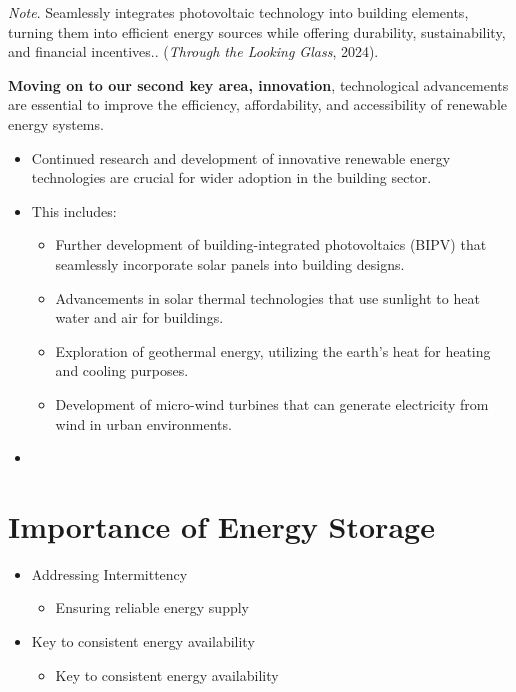 \documentclass[
  letterpaper,
  DIV=11,
  numbers=noendperiod]{scrartcl}
\providecommand{\tightlist}{%
  \setlength{\itemsep}{0pt}\setlength{\parskip}{0pt}}\usepackage{longtable,booktabs,array}
\begin{document}
\emph{Note}. Seamlessly integrates photovoltaic technology into building
elements, turning them into efficient energy sources while offering
durability, sustainability, and financial incentives.. (\emph{Through
the {Looking Glass}}, 2024).

\textbf{Moving on to our second key area, innovation}, technological
advancements are essential to improve the efficiency, affordability, and
accessibility of renewable energy systems.

\begin{itemize}
\tightlist
\item
  Continued research and development of innovative renewable energy
  technologies are crucial for wider adoption in the building sector.
\item
  This includes:

  \begin{itemize}
  \tightlist
  \item
    Further development of building-integrated photovoltaics (BIPV) that
    seamlessly incorporate solar panels into building designs.
  \item
    Advancements in solar thermal technologies that use sunlight to heat
    water and air for buildings.
  \item
    Exploration of geothermal energy, utilizing the earth's heat for
    heating and cooling purposes.
  \item
    Development of micro-wind turbines that can generate electricity
    from wind in urban environments.
  \end{itemize}
\end{itemize}

\begin{itemize}
\tightlist
\item
\end{itemize}

\section{Importance of Energy
Storage}\label{importance-of-energy-storage}

\begin{itemize}
\tightlist
\item
  Addressing Intermittency

  \begin{itemize}
  \tightlist
  \item
    Ensuring reliable energy supply
  \end{itemize}
\item
  Key to consistent energy availability

  \begin{itemize}
  \tightlist
  \item
    Key to consistent energy availability
  \end{itemize}
\end{itemize}
\end{document}
